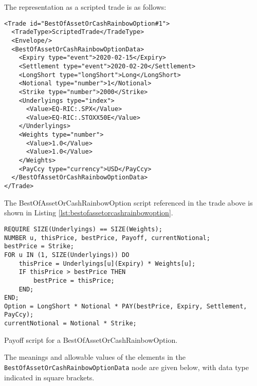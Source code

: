The representation as a scripted trade is as follows:

\begin{verbatim}
<Trade id="BestOfAssetOrCashRainbowOption#1">
  <TradeType>ScriptedTrade</TradeType>
  <Envelope/>
  <BestOfAssetOrCashRainbowOptionData>
    <Expiry type="event">2020-02-15</Expiry>
    <Settlement type="event">2020-02-20</Settlement>
    <LongShort type="longShort">Long</LongShort>
    <Notional type="number">1</Notional>
    <Strike type="number">2000</Strike>
    <Underlyings type="index">
      <Value>EQ-RIC:.SPX</Value>
      <Value>EQ-RIC:.STOXX50E</Value>
    </Underlyings>
    <Weights type="number">
      <Value>1.0</Value>
      <Value>1.0</Value>
    </Weights>
    <PayCcy type="currency">USD</PayCcy>
  </BestOfAssetOrCashRainbowOptionData>
</Trade>
\end{verbatim}

The BestOfAssetOrCashRainbowOption script referenced in the trade above is
shown in Listing \ref{lst:bestofassetorcashrainbowoption}.

\begin{listing}[hbt]
\begin{verbatim}
REQUIRE SIZE(Underlyings) == SIZE(Weights);
NUMBER u, thisPrice, bestPrice, Payoff, currentNotional;
bestPrice = Strike;
FOR u IN (1, SIZE(Underlyings)) DO
    thisPrice = Underlyings[u](Expiry) * Weights[u];
    IF thisPrice > bestPrice THEN
        bestPrice = thisPrice;
    END;
END;
Option = LongShort * Notional * PAY(bestPrice, Expiry, Settlement, PayCcy);
currentNotional = Notional * Strike;
\end{verbatim}
\caption{Payoff script for a BestOfAssetOrCashRainbowOption.}
\label{lst:bestofassetorcashrainbowoption}
\end{listing}

The meanings and allowable values of the elements in the
\lstinline!BestOfAssetOrCashRainbowOptionData! node are given below, with data
type indicated in square brackets.

